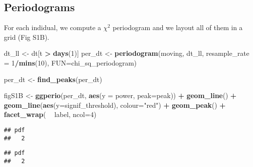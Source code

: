 \documentclass[]{article}
\newenvironment{Shaded}{\begin{snugshade}}{\end{snugshade}}
\newcommand{\DataTypeTok}[1]{\textcolor[rgb]{0.13,0.29,0.53}{#1}}
\newcommand{\DecValTok}[1]{\textcolor[rgb]{0.00,0.00,0.81}{#1}}
\newcommand{\KeywordTok}[1]{\textcolor[rgb]{0.13,0.29,0.53}{\textbf{#1}}}
\newcommand{\NormalTok}[1]{#1}
\newcommand{\OperatorTok}[1]{\textcolor[rgb]{0.81,0.36,0.00}{\textbf{#1}}}
\newcommand{\StringTok}[1]{\textcolor[rgb]{0.31,0.60,0.02}{#1}}
\begin{document}
\hypertarget{periodograms}{%
\subsection{Periodograms}\label{periodograms}}

For each indidual, we compute a \(\chi{}^2\) periodogram and we layout
all of them in a grid (Fig S1B).

\begin{Shaded}
\begin{Highlighting}[]
\NormalTok{dt_ll <-}\StringTok{ }\NormalTok{dt[t }\OperatorTok{>}\StringTok{ }\KeywordTok{days}\NormalTok{(}\DecValTok{1}\NormalTok{)]}
\NormalTok{per_dt <-}\StringTok{ }\KeywordTok{periodogram}\NormalTok{(moving, }
\NormalTok{                        dt_ll, }
                        \DataTypeTok{resample_rate =} \DecValTok{1}\OperatorTok{/}\KeywordTok{mins}\NormalTok{(}\DecValTok{10}\NormalTok{),}
                        \DataTypeTok{FUN=}\NormalTok{chi_sq_periodogram)}

\NormalTok{per_dt <-}\StringTok{ }\KeywordTok{find_peaks}\NormalTok{(per_dt)}

\NormalTok{figS1B <-}\StringTok{ }\KeywordTok{ggperio}\NormalTok{(per_dt, }\KeywordTok{aes}\NormalTok{(}\DataTypeTok{y =}\NormalTok{ power, }\DataTypeTok{peak=}\NormalTok{peak)) }\OperatorTok{+}\StringTok{ }
\StringTok{      }\KeywordTok{geom_line}\NormalTok{() }\OperatorTok{+}
\StringTok{      }\KeywordTok{geom_line}\NormalTok{(}\KeywordTok{aes}\NormalTok{(}\DataTypeTok{y=}\NormalTok{signif_threshold), }\DataTypeTok{colour=}\StringTok{"red"}\NormalTok{) }\OperatorTok{+}\StringTok{ }
\StringTok{      }\KeywordTok{geom_peak}\NormalTok{() }\OperatorTok{+}\StringTok{ }
\StringTok{      }\KeywordTok{facet_wrap}\NormalTok{( }\OperatorTok{~}\StringTok{ }\NormalTok{label, }\DataTypeTok{ncol=}\DecValTok{4}\NormalTok{) }
\end{Highlighting}
\end{Shaded}

\begin{verbatim}
## pdf 
##   2
\end{verbatim}

\begin{verbatim}
## pdf 
##   2
\end{verbatim}
\end{document}

